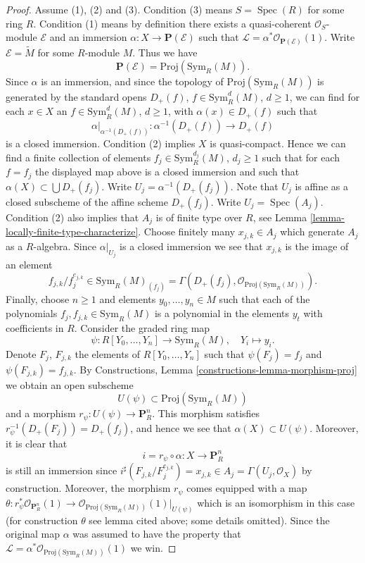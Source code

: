 \documentclass[10pt,a4paper]{amsart}
\theoremstyle{plain}
\theoremstyle{definition}
\theoremstyle{remark}
\numberwithin{equation}{subsection}
\def\Spec{\mathop{\mathrm{Spec}}}
\begin{document}
\begin{proof}
Assume (1), (2) and (3).
Condition (3) means $S = \Spec(R)$ for some ring $R$.
Condition (1) means by definition
there exists a quasi-coherent $\mathcal{O}_S$-module
$\mathcal{E}$ and an immersion $\alpha : X \to \mathbf{P}(\mathcal{E})$
such that $\mathcal{L} = \alpha^*\mathcal{O}_{\mathbf{P}(\mathcal{E})}(1)$.
Write $\mathcal{E} = \widetilde{M}$ for some $R$-module $M$.
Thus we have
$$
\mathbf{P}(\mathcal{E}) = \text{Proj}(\text{Sym}_R(M)).
$$
Since $\alpha$ is an immersion, and since the topology of
$\text{Proj}(\text{Sym}_R(M))$ is generated by the standard
opens $D_{+}(f)$, $f \in \text{Sym}_R^d(M)$, $d \geq 1$,
we can find for each $x \in X$ an
$f \in \text{Sym}_R^d(M)$, $d \geq 1$, with $\alpha(x) \in D_{+}(f)$
such that
$$
\alpha|_{\alpha^{-1}(D_{+}(f))} : \alpha^{-1}(D_{+}(f)) \to D_{+}(f)
$$
is a closed immersion.
Condition (2) implies $X$ is quasi-compact. Hence we can find
a finite collection of elements
$f_j \in \text{Sym}_R^{d_j}(M)$, $d_j \geq 1$
such that for each $f = f_j$ the displayed map above
is a closed immersion and such that $\alpha(X) \subset \bigcup D_{+}(f_j)$.
Write $U_j = \alpha^{-1}(D_{+}(f_j))$. Note that $U_j$ is affine
as a closed subscheme of the affine scheme $D_{+}(f_j)$.
Write $U_j = \Spec(A_j)$. Condition (2) also implies that
$A_j$ is of finite type over $R$, see
Lemma \ref{lemma-locally-finite-type-characterize}.
Choose finitely many $x_{j, k} \in A_j$ which
generate $A_j$ as a $R$-algebra. Since $\alpha|_{U_j}$ is a closed
immersion we see that $x_{j, k}$ is the image of an element
$$
f_{j, k}/f_j^{e_{j, k}} \in \text{Sym}_R(M)_{(f_j)}
=
\Gamma(D_{+}(f_j), \mathcal{O}_{\text{Proj}(\text{Sym}_R(M))}).
$$
Finally, choose $n \geq 1$ and elements $y_0, \ldots, y_n \in M$ such that each
of the polynomials $f_j, f_{j, k} \in \text{Sym}_R(M)$ is a polynomial
in the elements $y_t$ with coefficients in $R$.
Consider the graded ring map
$$
\psi : R[Y_0, \ldots, Y_n] \longrightarrow \text{Sym}_R(M),
\quad Y_i \longmapsto y_i.
$$
Denote $F_j$, $F_{j, k}$ the elements of $R[Y_0, \ldots, Y_n]$ such
that $\psi(F_j) = f_j$ and $\psi(F_{j, k}) = f_{j, k}$.
By Constructions, Lemma \ref{constructions-lemma-morphism-proj}
we obtain an open subscheme
$$
U(\psi) \subset \text{Proj}(\text{Sym}_R(M))
$$
and a morphism
$r_\psi : U(\psi) \to \mathbf{P}^n_R$. This morphism
satisfies $r_\psi^{-1}(D_{+}(F_j)) = D_{+}(f_j)$, and hence we see
that $\alpha(X) \subset U(\psi)$. Moreover, it is clear
that
$$
i = r_\psi \circ \alpha : X \longrightarrow \mathbf{P}^n_R
$$
is still an immersion since
$i^\sharp(F_{j, k}/F_j^{e_{j, k}}) = x_{j, k} \in
A_j = \Gamma(U_j, \mathcal{O}_X)$
by construction. Moreover, the morphism $r_\psi$ comes
equipped with a map
$\theta : r_\psi^*\mathcal{O}_{\mathbf{P}^n_R}(1)
\to \mathcal{O}_{\text{Proj}(\text{Sym}_R(M))}(1)|_{U(\psi)}$
which is an isomorphism in this case (for construction $\theta$
see lemma cited above; some details omitted).
Since the original map $\alpha$ was assumed to have the
property that
$\mathcal{L} = \alpha^*\mathcal{O}_{\text{Proj}(\text{Sym}_R(M))}(1)$
we win.
\end{proof}
\end{document}
